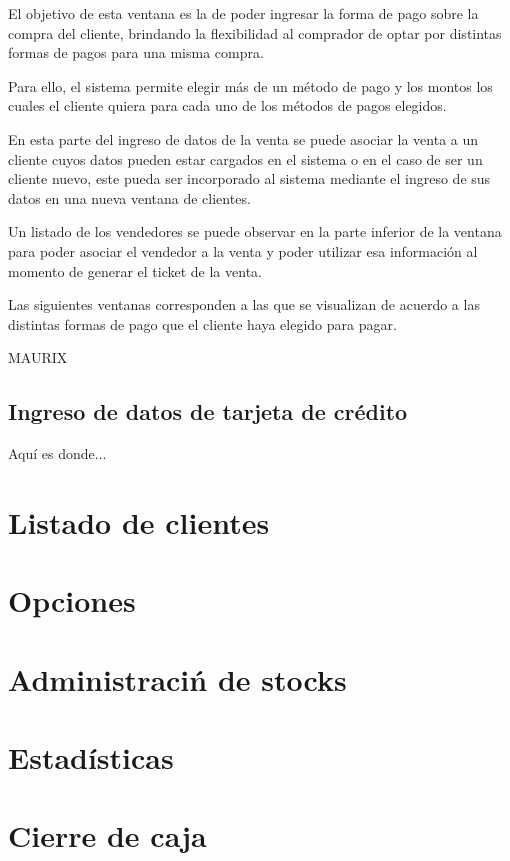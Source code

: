 El objetivo de esta ventana es la de poder ingresar la forma de pago sobre la compra del cliente, brindando la flexibilidad al comprador de optar por distintas formas de pagos para una misma compra.

Para ello, el sistema permite elegir m\'as de un m\'etodo de pago y los montos los cuales el cliente quiera para cada uno de los m\'etodos de pagos elegidos.

En esta parte del ingreso de datos de la venta se puede asociar la venta a un cliente cuyos datos pueden estar cargados en el sistema o en el caso de ser un cliente nuevo, este pueda ser incorporado al sistema mediante el ingreso de sus datos en una nueva ventana de clientes.

Un listado de los vendedores se puede observar en la parte inferior de la ventana para poder asociar el vendedor a la venta y poder utilizar esa informaci\'on al momento de generar el ticket de la venta.

Las siguientes ventanas corresponden a las que se visualizan de acuerdo a las distintas formas de pago que el cliente haya elegido para pagar.

MAURIX

\subsection{Ingreso de datos de tarjeta de cr\'edito}
\label{subsec:ui.addsale.creditcard}

Aqu\'i es donde...

\section{Listado de clientes}
\label{sec:ui.clientlist}

\section{Opciones}
\label{sec:ui.options}

\section{Administraci\'n de stocks}
\label{sec:ui.stocks}

\section{Estad\'isticas}
\label{sec:ui.statistics}

\section{Cierre de caja}
\label{sec:ui.closecash}
